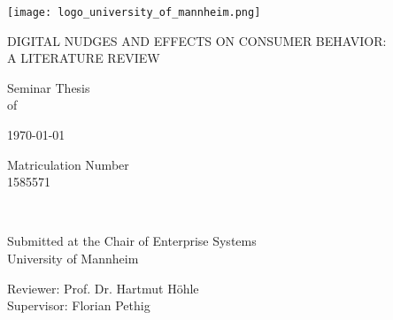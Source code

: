 \begin{titlepage}
	\centering

    \texttt{[image: logo\_university\_of\_mannheim.png]}\par

	\vspace{1.25cm}
	{\scshape\Large\uppercase{Digital Nudges and Effects on Consumer Behavior: \\ A Literature Review}\par}
	
	\vspace{2.5cm}
	{\linespread{1}\normalsize Seminar Thesis\\
	 of  \par}
	
	{\large {}\par}
	
	\vspace{0.5cm}
	{\small \titledate\today \par} %
	
	\vspace{0.3cm}
	{\footnotesize  Matriculation Number\\
	1585571\par}
	
	\vspace{2.5cm}
	\hrulefill\\	
	\vspace{1.0cm}
	{\linespread{1}\normalsize Submitted at the Chair of Enterprise Systems\\
	University of Mannheim\par}
	
	\vspace{0.3cm}
	{\linespread{1}\normalsize  Reviewer: Prof. Dr. Hartmut Höhle\\
	Supervisor: Florian Pethig\par}


\end{titlepage}
\renewcommand{\contentsname}{Table of Contents} %




